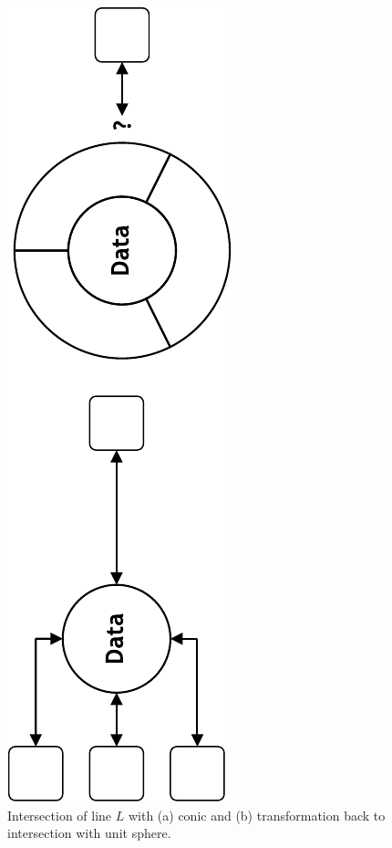 \begin{figure}[t]\centering
\includegraphics[width=0.8\columnwidth]{diagram1}
\caption{\label{fig:conic_transform}Intersection of line $L$ with 
  (a) conic and (b) transformation back to intersection with unit sphere.}
\end{figure}

